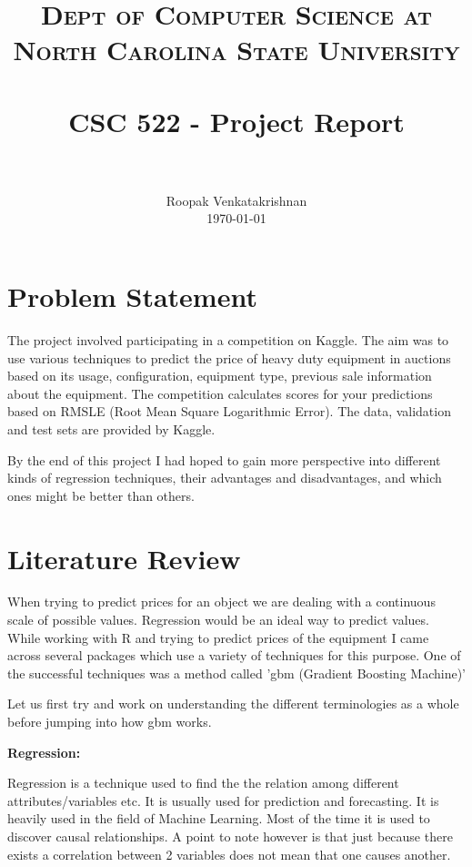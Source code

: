 \documentclass[paper=a4, fontsize=11pt]{scrartcl}	%
\title{
		\usefont{OT1}{bch}{b}{n}
		\normalfont \normalsize \textsc{Dept of Computer Science at North Carolina State University} \\ [25pt]
		\horrule{0.5pt} \\[0.4cm]
		\huge CSC 522 - Project Report \\
		\horrule{2pt} \\[0.5cm]
}
\author{
		\normalfont 								\normalsize
        Roopak Venkatakrishnan\\[-3pt]		\normalsize
        \today
}
\date{}
\numberwithin{equation}{section}		%
\numberwithin{figure}{section}			%
\numberwithin{table}{section}				%
\begin{document}
\maketitle
\pagebreak
\section{Problem Statement}
The project involved participating in a competition on Kaggle. The aim was to use various techniques to predict the price of heavy duty equipment in auctions based on its usage, configuration, equipment type, previous sale information about the equipment. The competition calculates scores for your predictions based on RMSLE (Root Mean Square Logarithmic Error). The data, validation and test sets are provided by Kaggle. 

By the end of this project I had hoped to gain more perspective into different kinds of regression techniques, their advantages and disadvantages, and which ones might be better than others.

\pagebreak
\tableofcontents
\pagebreak

\section{Literature Review}

When trying to predict prices for an object we are dealing with a continuous scale of possible values. Regression would be an ideal way to predict values. While working with R and trying to predict prices of the equipment I came across several packages which use a variety of techniques for this purpose. One of the successful techniques was a method called 'gbm (Gradient Boosting Machine)'

Let us first try and work on understanding the different terminologies as a whole before jumping into how gbm works.

\begin{minipage}{\textwidth}
\textbf{Regression:}

 Regression is a technique used to find the the relation among different attributes/variables etc. It is usually used for prediction and forecasting. It is heavily used in the field of Machine Learning. Most of the time it is used to discover causal relationships. A point to note however is that just because there exists a correlation between 2 variables does not mean that one causes another.\\
\end{minipage}
\end{document}
